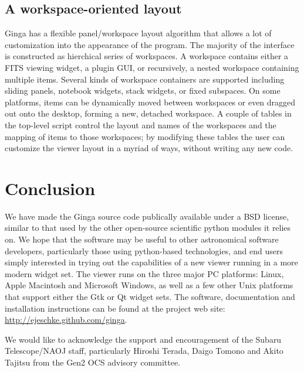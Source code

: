 \documentclass[11pt,twoside]{article}
\begin{document}
\subsection{A workspace-oriented layout}
Ginga has a flexible panel/workspace layout algorithm that allows a
lot of customization into the appearance of the program.  The majority
of the interface is constructed as hierchical series of workspaces.
A workspace contains either a FITS viewing widget, a plugin GUI, or
recursively, a nested workspace containing multiple items.
Several kinds of workspace containers are supported including sliding
panels, notebook widgets, stack widgets, or fixed subspaces. 
On some platforms, items can be dynamically moved between workspaces or
even dragged out onto the desktop, forming a new, detached workspace.
A couple of tables in the top-level script control the layout and names of
the workspaces and the mapping of items to those workspaces;
by modifying these tables the user can customize the viewer layout in a
myriad of ways, without writing any new code. 

\section{Conclusion}
We have made the Ginga source code publically available under a BSD
license, similar to that used by the other open-source scientific python
modules it relies on. 
We hope that the software may be useful to other astronomical software
developers, particularly those using python-based technologies, and end
users simply interested in trying out the capabilities of a new viewer
running in a more modern widget set.  The viewer runs on the three major
PC platforms: Linux, Apple Macintosh and Microsoft Windows, as well as a
few other Unix platforms that support either the Gtk or Qt widget sets.
The software, documentation and installation instructions can be found
at the project web site: \url{http://ejeschke.github.com/ginga}.

\medskip
\acknowledgements We would like to acknowledge the support and
encouragement of the Subaru Telescope/NAOJ staff, particularly Hiroshi
Terada, Daigo Tomono and Akito Tajitsu from the Gen2 OCS advisory
committee. 


\end{document}
